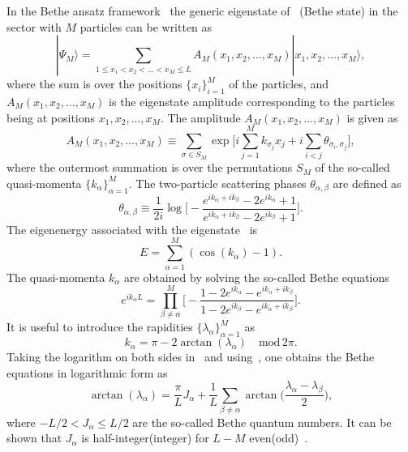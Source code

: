 \documentclass[11pt]{iopart}
\begin{document}
In the Bethe ansatz framework~\cite{bethe-1931,taka-book} the generic eigenstate 
of~ (Bethe state) in the sector with $M$ particles can be written as 
%
\begin{equation}
\label{ba-eig}
|\Psi_M\rangle=\sum\limits_{1\le x_1<x_2<\dots<x_M\le L}A_M(x_1,x_2,
\dots,x_M)|x_1,x_2,\dots,x_M\rangle,
\end{equation}
%
where the sum is over the positions $\{x_i\}_{i=1}^M$ of the particles, and $A_M(x_1,
x_2,\dots,x_M)$ is the eigenstate amplitude corresponding to the particles 
being at positions $x_1,x_2,\dots, x_M$. The amplitude $A_M(x_1,x_2,\dots, x_M)$ is 
given as 
%
\begin{equation}
\label{ba_amp}
A_M(x_1,x_2,\dots,x_M)\equiv\sum\limits_{\sigma\in S_M}\exp\Big[i
\sum\limits_{j=1}^Mk_{\sigma_j}x_j+i\sum\limits_{i<j}\theta_{\sigma_i,\sigma_j}
\Big], 
\end{equation}
%
where the outermost summation is over the permutations $S_M$ of the so-called 
quasi-momenta $\{k_\alpha\}_{\alpha=1}^M$. The two-particle scattering phases 
$\theta_{\alpha,\beta}$ are defined as 
%
\begin{equation}
\label{s_phases}
\theta_{\alpha,\beta}\equiv \frac{1}{2i}\log\Big[-\frac{e^{ik_\alpha+ik_\beta}-
2e^{ik_\alpha}+1}{e^{ik_\alpha+ik_\beta}-2e^{ik_\beta}+1}\Big].
\end{equation}
%
The eigenenergy associated with the eigenstate~ is  
%
\begin{equation}
\label{ba-ener}
E=\sum\limits_{\alpha=1}^M(\cos(k_\alpha)-1). 
\end{equation}
%
The quasi-momenta $k_\alpha$ are obtained by solving the so-called Bethe 
equations~\cite{bethe-1931}
%
\begin{equation}
\label{ba-eq}
e^{ik_\alpha L}=\prod\limits^M_{\beta\ne\alpha}\Big[-\frac{1-2e^{
ik_\alpha}-e^{ik_\alpha+ik_\beta}}{1-2e^{ik_\beta}-e^{ik_\alpha+
ik_\beta}}\Big].
\end{equation}
%
It is useful to  introduce the rapidities $\{\lambda_\alpha\}_{\alpha=1}^M$ as 
%
\begin{equation}
\label{rap}
k_\alpha=\pi-2\arctan(\lambda_\alpha)\quad\mbox{mod}\, 2\pi.
\end{equation}
%
Taking the logarithm on both sides in~ and using~, 
one obtains the Bethe equations in logarithmic form as 
%
\begin{equation}
\label{ba-eq-log}
\arctan(\lambda_\alpha)=\frac{\pi}{L}J_\alpha+\frac{1}{L}\sum\limits_{
\beta\ne\alpha}\arctan\Big(\frac{\lambda_\alpha-\lambda_\beta}{2}\Big),
\end{equation}
%
where $-L/2<J_\alpha\le L/2$ are the so-called Bethe quantum numbers. It can 
be shown that $J_\alpha$ is half-integer(integer) for $L-M$ even(odd)~\cite{taka-book}. 
\end{document}
